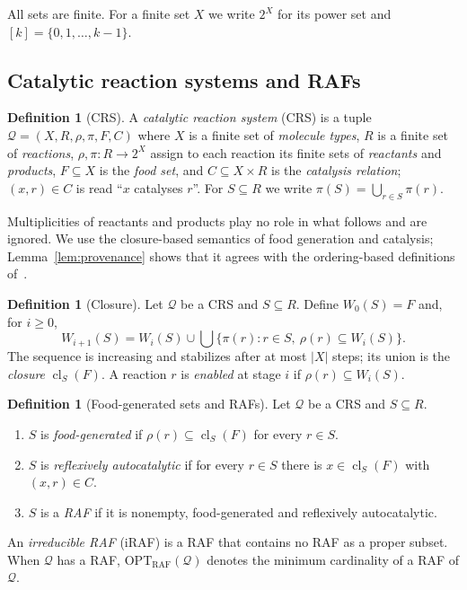 \documentclass[11pt,a4paper]{article}
\theoremstyle{plain}
\theoremstyle{definition}
\newtheorem{definition}[theorem]{Definition}
\theoremstyle{remark}
\newcommand{\cl}{\operatorname{cl}}
\newcommand{\OPT}{\mathrm{OPT}}
\newcommand{\RAF}{\mathrm{RAF}}
\newcommand{\optraf}{\OPT_{\RAF}}
\newcommand{\cQ}{\mathcal{Q}}
\newcommand{\pw}[1]{2^{#1}}
\begin{document}
All sets are finite. For a finite set $X$ we write $\pw{X}$ for its power set and $[k]=\{0,1,\dots,k-1\}$.

\subsection{Catalytic reaction systems and RAFs}\label{sec:crs}

\begin{definition}[CRS]\label{def:crs}
A \emph{catalytic reaction system} (CRS) is a tuple $\cQ=(X,R,\rho,\pi,F,C)$ where $X$ is a finite set of \emph{molecule types}, $R$ is a finite set of \emph{reactions}, $\rho,\pi\colon R\to\pw{X}$ assign to each reaction its finite sets of \emph{reactants} and \emph{products}, $F\subseteq X$ is the \emph{food set}, and $C\subseteq X\times R$ is the \emph{catalysis relation}; $(x,r)\in C$ is read ``$x$ catalyses $r$''. For $S\subseteq R$ we write $\pi(S)=\bigcup_{r\in S}\pi(r)$.
\end{definition}

Multiplicities of reactants and products play no role in what follows and are ignored. We use the closure-based semantics of food generation and catalysis; Lemma~\ref{lem:provenance} shows that it agrees with the ordering-based definitions of~\cite{hordijk2004detecting,steel2013minimal}.

\begin{definition}[Closure]\label{def:closure}
Let $\cQ$ be a CRS and $S\subseteq R$. Define $W_0(S)=F$ and, for $i\ge 0$,
\[
W_{i+1}(S)=W_i(S)\cup\bigcup\{\pi(r): r\in S,\ \rho(r)\subseteq W_i(S)\}.
\]
The sequence is increasing and stabilizes after at most $|X|$ steps; its union is the \emph{closure} $\cl_S(F)$. A reaction $r$ is \emph{enabled} at stage $i$ if $\rho(r)\subseteq W_i(S)$.
\end{definition}

\begin{definition}[Food-generated sets and RAFs]\label{def:raf}
Let $\cQ$ be a CRS and $S\subseteq R$.
\begin{enumerate}[label=(\roman*)]
\item $S$ is \emph{food-generated} if $\rho(r)\subseteq\cl_S(F)$ for every $r\in S$.
\item $S$ is \emph{reflexively autocatalytic} if for every $r\in S$ there is $x\in\cl_S(F)$ with $(x,r)\in C$.
\item $S$ is a \emph{RAF} if it is nonempty, food-generated and reflexively autocatalytic.
\end{enumerate}
An \emph{irreducible RAF} (iRAF) is a RAF that contains no RAF as a proper subset. When $\cQ$ has a RAF, $\optraf(\cQ)$ denotes the minimum cardinality of a RAF of $\cQ$.
\end{definition}
\end{document}
